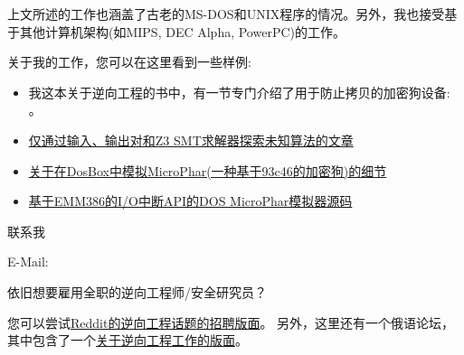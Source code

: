 上文所述的工作也涵盖了古老的MS-DOS和UNIX程序的情况。另外，我也接受基于其他计算机架构(如MIPS, DEC Alpha, PowerPC)的工作。

关于我的工作，您可以在这里看到一些样例:

\begin{itemize}
\item 我这本关于逆向工程的书中，有一节专门介绍了用于防止拷贝的加密狗设备: 。
\item \href{http://yurichev.com/writings/z3_rockey.pdf}{仅通过输入、输出对和Z3 SMT求解器探索未知算法的文章}
\item \href{http://yurichev.com/blog/56/}{关于在DosBox中模拟MicroPhar(一种基于93c46的加密狗)的细节}
\item \href{http://conus.info/dongle/src/microph.asm}{基于EMM386的I/O中断API的DOS MicroPhar模拟器源码}
\end{itemize}

\large 联系我 \normalsize

E-Mail: \GTT{\EMAIL}

\large 依旧想要雇用全职的逆向工程师/安全研究员？ \normalsize

您可以尝试\href{https://www.reddit.com/r/ReverseEngineering/comments/49cza0/rreverseengineerings_2015_triannual_hiring_thread/}{Reddit的逆向工程话题的招聘版面}。
另外，这里还有一个俄语论坛，其中包含了一个\href{https://forum.reverse4you.org/forumdisplay.php?f=252}{关于逆向工程工作的版面}。

\vspace*{\fill}
\vfill
